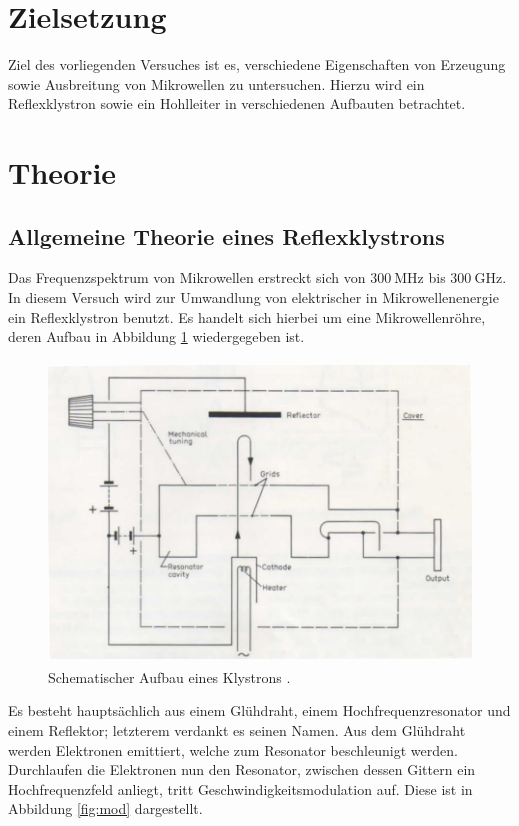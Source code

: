 \section{Zielsetzung}

Ziel des vorliegenden Versuches ist es, verschiedene Eigenschaften von Erzeugung sowie Ausbreitung von Mikrowellen zu untersuchen.
Hierzu wird ein Reflexklystron sowie ein Hohlleiter in verschiedenen Aufbauten betrachtet.

\section{Theorie}
\label{sec:Theorie}
\subsection{Allgemeine Theorie eines Reflexklystrons}
\label{sec:klysto}

Das Frequenzspektrum von Mikrowellen erstreckt sich von $\SI{300}{\mega\hertz}$ bis $\SI{300}{\giga\hertz}$.
In diesem Versuch wird zur Umwandlung von elektrischer in Mikrowellenenergie ein Reflexklystron benutzt.
Es handelt sich hierbei um eine Mikrowellenröhre, deren Aufbau in Abbildung \ref{fig:klystron} wiedergegeben ist.

\begin{figure}
  \centering
  \includegraphics[height=8cm]{ressources/theorie.png}
  \caption{Schematischer Aufbau eines Klystrons \cite{skript}.}
  \label{fig:klystron}
\end{figure}

Es besteht hauptsächlich aus einem Glühdraht, einem Hochfrequenzresonator und einem Reflektor; letzterem verdankt es seinen Namen.
Aus dem Glühdraht werden Elektronen emittiert, welche zum Resonator beschleunigt werden.
Durchlaufen die Elektronen nun den Resonator, zwischen dessen Gittern ein Hochfrequenzfeld anliegt, tritt Geschwindigkeitsmodulation auf.
Diese ist in Abbildung \ref{fig:mod} dargestellt.

